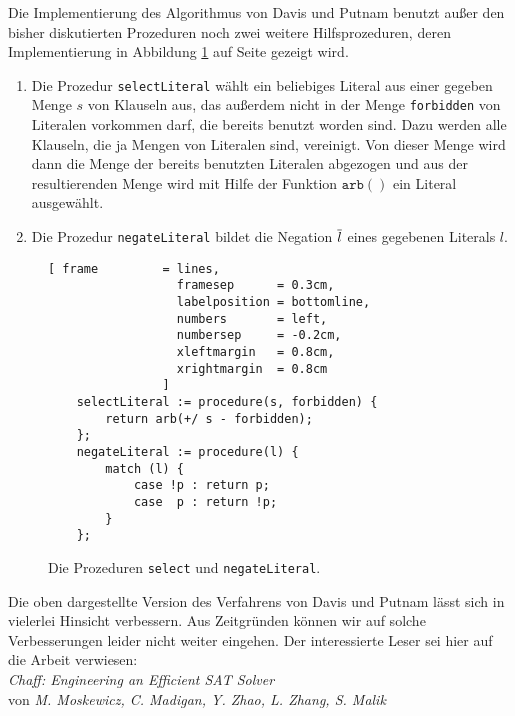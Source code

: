 Die Implementierung des Algorithmus von Davis und Putnam benutzt au\ss{}er den bisher diskutierten Prozeduren
noch zwei weitere Hilfsprozeduren, deren Implementierung in 
Abbildung \ref{fig:solve-aux} auf Seite \pageref{fig:solve-aux} gezeigt wird.
\begin{enumerate}
\item Die Prozedur \texttt{selectLiteral} w\"{a}hlt ein beliebiges Literal aus 
      einer gegeben Menge $s$ von Klauseln aus, das au\ss{}erdem nicht in der Menge
      \texttt{forbidden} von Literalen vorkommen darf, die bereits benutzt worden sind.
      Dazu werden alle Klauseln, die ja Mengen von Literalen sind, vereinigt.  Von dieser
      Menge wird dann die Menge der bereits benutzten Literalen abgezogen und aus der
      resultierenden Menge wird mit Hilfe der Funktion $\texttt{arb}()$ ein Literal ausgew\"{a}hlt.
\item Die Prozedur \texttt{negateLiteral} bildet die Negation $\overline{l}$ 
      eines gegebenen Literals $l$.  
\end{enumerate}
\begin{figure}[!ht]
  \centering
\begin{Verbatim}[ frame         = lines, 
                  framesep      = 0.3cm, 
                  labelposition = bottomline,
                  numbers       = left,
                  numbersep     = -0.2cm,
                  xleftmargin   = 0.8cm,
                  xrightmargin  = 0.8cm
                ]
    selectLiteral := procedure(s, forbidden) {
        return arb(+/ s - forbidden);
    };
    negateLiteral := procedure(l) {
        match (l) {
            case !p : return p;
            case  p : return !p;
        }
    };
\end{Verbatim}
\vspace*{-0.3cm}
  \caption{Die Prozeduren \texttt{select} und \texttt{negateLiteral}.}
  \label{fig:solve-aux}
\end{figure}

Die oben dargestellte Version des Verfahrens von Davis und Putnam l\"{a}sst sich in vielerlei
Hinsicht verbessern.  Aus Zeitgr\"{u}nden k\"{o}nnen wir auf solche Verbesserungen leider nicht
weiter eingehen. Der interessierte Leser sei hier auf die Arbeit \cite{moskewicz01}  verwiesen:
\\[0.2cm]
\hspace*{1.3cm} \textsl{Chaff: Engineering an Efficient SAT Solver} \\
\hspace*{1.3cm} von \emph{M. Moskewicz, C. Madigan, Y. Zhao, L. Zhang, S. Malik} 


